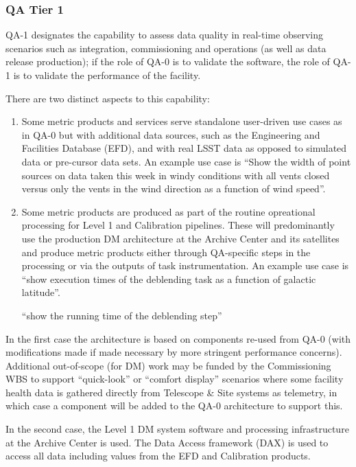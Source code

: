 \subsubsection{QA Tier 1}

QA-1 designates the capability to assess data quality in real-time observing scenarios such as integration, commissioning and operations (as well as data release production); if the role of QA-0 is to validate the software, the role of QA-1 is to validate the performance of the facility.

There are two distinct aspects to this capability:

\begin{enumerate}
\item Some metric products and services serve standalone user-driven use cases as in QA-0 but with additional data sources, such as the Engineering and Facilities Database (EFD), and with real LSST data as opposed to simulated data or pre-cursor data sets.  An example use case is ``Show the width of point sources on data taken this week in windy conditions with all vents closed versus only the vents in the wind direction as a function of wind speed''.

\item Some metric products are produced as part of the routine opreational processing for Level 1 and Calibration pipelines. These will predominantly use the production DM architecture at the Archive Center and its satellites and produce metric products either through QA-specific steps in the processing or via the outputs of task instrumentation. An example use case is ``show execution times of the deblending task as a function of galactic latitude''.



``show the running time of the deblending step''

\end{enumerate}

In the first case the architecture is based on components re-used from QA-0 (with modifications made if made necessary by more stringent performance concerns). Additional out-of-scope (for DM) work may be funded by the Commissioning WBS to support ``quick-look'' or ``comfort display'' scenarios where some facility health data is gathered directly from Telescope \& Site systems as telemetry, in which case a component will be added to the QA-0 architecture to support this.

In the second case, the Level 1 DM system software and processing infrastructure at the Archive Center is used. The Data Access framework (DAX) is used to access all data including values from the EFD and Calibration products.

